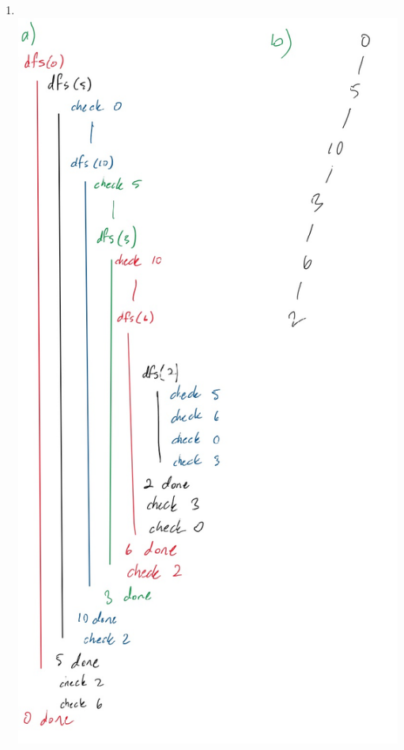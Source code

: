 \documentclass[11pt,fleqn]{article}
\begin{document}
\begin{enumerate}
	\item $~$\\
\includegraphics[scale=0.75]{Q2}

\newpage


\end{enumerate}
\end{document}

